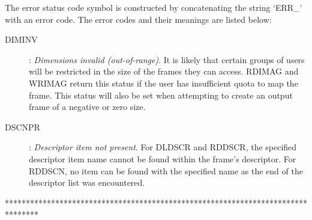 The error status code symbol is constructed by concatenating the string
`ERR\_' with an error code.
The error codes and their meanings are listed below:
\begin{description}
\item [DIMINV]:
{\em Dimensions invalid (out-of-range)}.
It is likely that certain groups of users will be restricted in the size of the
frames they can access.
RDIMAG and WRIMAG return this status if the user has insufficient quota to map
the frame.
This status will also be set when attempting to create an output frame of a
negative or zero size.
\item [DSCNPR]:
{\em Descriptor item not present}.
For DLDSCR and RDDSCR, the specified descriptor item name cannot be found within
the frame's descriptor.
For RDDSCN, no item can be found with the specified name as the end of the
descriptor list was encountered.
\end{description}

********************************************************************************

